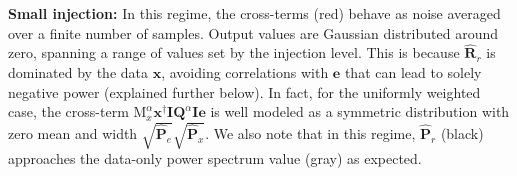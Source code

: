 \documentclass[preprint2,numberedappendix,tighten]{aastex6}
\begin{document}
{\bf Small injection:}
In this regime, the cross-terms (red) behave as noise averaged over a finite number of samples. Output values are Gaussian distributed around zero, spanning a range of values set by the injection level. This is because $\widehat{\textbf{R}}_{r}$ is dominated by the data $\textbf{x}$, avoiding correlations with $\textbf{e}$ that can lead to solely negative power (explained further below). In fact, for the uniformly weighted case, the cross-term  $\text{M}^{\alpha}_{x}\textbf{x}^{\dagger}\textbf{I}\textbf{Q}^{\alpha}\textbf{I}\textbf{e}$ is well modeled as a symmetric distribution with zero mean and width $\sqrt{\widehat{\textbf{P}}_e}\sqrt{\widehat{\textbf{P}}_x}$. We also note that in this regime, $\widehat{\textbf{P}}_{r}$ (black) approaches the data-only power spectrum value (gray) as expected. %
\end{document}
